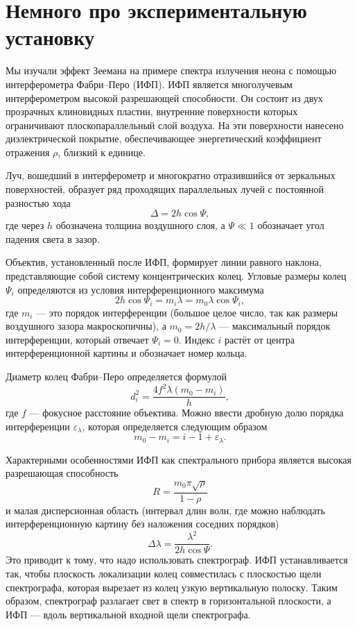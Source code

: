 \documentclass[12pt]{article}
\begin{document}
	\section{Немного про экспериментальную установку}
	Мы изучали эффект Зеемана на примере спектра излучения неона с помощью интерферометра Фабри\---Перо (ИФП). ИФП является многолучевым интерферометром высокой разрешающей способности. Он состоит из двух прозрачных клиновидных пластин, внутренние поверхности которых ограничивают плоскопараллельный слой воздуха. На эти поверхности нанесено диэлектрической покрытие, обеспечивающее энергетический коэффициент отражения $\rho$, близкий к единице.
	\par Луч, вошедший в интерферометр и многократно отразившийся от зеркальных поверхностей, образует ряд проходящих параллельных лучей с постоянной разностью хода
	\begin{equation}
		\Delta = 2h\cos{\Psi},
	\end{equation}
	где через $h$ обозначена толщина воздушного слоя, а $\Psi \ll 1$ обозначает угол падения света в зазор.
	\par Объектив, установленный после ИФП, формирует линии равного наклона, представляющие собой систему концентрических колец. Угловые размеры колец $\Psi_i$ определяются из условия интерференционного максимума
	\begin{equation}
		2h\cos{\Psi_i} = m_i \lambda = m_0 \lambda \cos{\Psi_i},
	\end{equation} 
	где $m_i$ \---- это порядок интерференции (большое целое число, так как размеры воздушного зазора макроскопичны), а $m_0 = 2h / \lambda$ \---- максимальный порядок интерференции, который отвечает $\Psi_i=0$. Индекс $i$ растёт от центра интерференционной картины и обозначает номер кольца.
	\par Диаметр колец Фабри\---Перо определяется формулой
	\begin{equation}
		d^2_i = \dfrac{4f^2\lambda(m_0-m_i)}{h},
	\end{equation}
	где $f$ \---- фокусное расстояние объектива. Можно ввести дробную долю порядка интерференции $\varepsilon_\lambda$, которая определяется следующим образом
	\begin{equation}
		m_0-m_i = i - 1 + \varepsilon_\lambda.
	\end{equation}
	\par Характерными особенностями ИФП как спектрального прибора является высокая разрешающая способность
	\begin{equation}\label{eq:6}
		R = \dfrac{m_0 \pi \sqrt{\rho}}{1-\rho}
	\end{equation}
	и малая дисперсионная область (интервал длин волн, где можно наблюдать интерференционную картину без наложения соседних порядков)
	\begin{equation}
		\Delta \lambda = \dfrac{\lambda^2}{2h\cos{\Psi}}.
	\end{equation}
	Это приводит к тому, что надо использовать спектрограф. ИФП устанавливается так, чтобы плоскость локализации колец совместилась с плоскостью щели спектрографа, которая вырезает из колец узкую вертикальную полоску. Таким образом, спектрограф разлагает свет в спектр в горизонтальной плоскости, а ИФП \---- вдоль вертикальной входной щели спектрографа.
\end{document}
